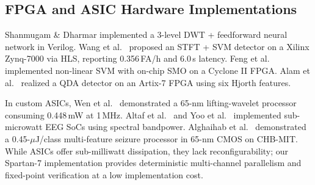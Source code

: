 \documentclass[10pt,twocolumn,letterpaper]{article}
\begin{document}
\subsection{FPGA and ASIC Hardware Implementations}
\label{sec:hw}

Shanmugam \& Dharmar \cite{shanmugam2025ffnn} implemented a 3-level DWT + feedforward neural network in Verilog. Wang et al.\ \cite{wang2017integrating} proposed an STFT + SVM detector on a Xilinx Zynq-7000 via HLS, reporting 0.356\,FA/h and 6.0\,s latency. Feng et al.\ \cite{feng2018vlsi} implemented non-linear SVM with on-chip SMO on a Cyclone II FPGA. Alam et al.\ \cite{alam2024qda} realized a QDA detector on an Artix-7 FPGA using six Hjorth features.

In custom ASICs, Wen et al.\ \cite{wen2022asic} demonstrated a 65-nm lifting-wavelet processor consuming 0.448\,mW at 1\,MHz. Altaf et al.\ \cite{altaf2015biomedical} and Yoo et al.\ \cite{yoo2013eight} implemented sub-microwatt EEG SoCs using spectral bandpower. Alghaihab et al.\ \cite{alghaihab2022energy} demonstrated a 0.45-$\mu$J/class multi-feature seizure processor in 65-nm CMOS on CHB-MIT. While ASICs offer sub-milliwatt dissipation, they lack reconfigurability; our Spartan-7 implementation provides deterministic multi-channel parallelism and fixed-point verification at a low implementation cost.
\end{document}
